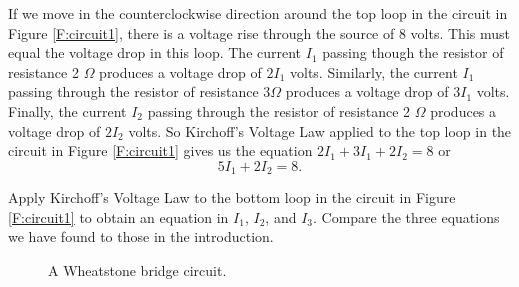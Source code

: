 If we move in the counterclockwise direction around the top loop in the circuit in Figure \ref{F:circuit1}, there is a voltage rise through the source of 8 volts. This must equal the voltage drop in this loop. The current $I_1$ passing though the resistor of resistance 2 $\Omega$ produces a voltage drop of $2I_1$ volts. Similarly, the current $I_1$ passing through the resistor of resistance $3 \Omega$ produces a voltage drop of $3I_1$ volts. Finally, the current $I_2$ passing through the resistor of resistance 2 $\Omega$ produces a voltage drop of $2I_2$ volts. So Kirchoff's Voltage Law applied to the top loop in the circuit in Figure \ref{F:circuit1} gives us the equation $2I_1 + 3I_1 + 2I_2 = 8$ or 
\[5I_1 + 2I_2 = 8.\]

\begin{pactivity} Apply Kirchoff's Voltage Law to the bottom loop in the circuit in Figure \ref{F:circuit1} to obtain an equation in $I_1$, $I_2$, and $I_3$. Compare the three equations we have found to those in the introduction.
\end{pactivity}
 
\begin{figure}[h]
\begin{center}
\end{center}
\caption{A Wheatstone bridge circuit.}
\label{F:Wheatstone}
\end{figure}

